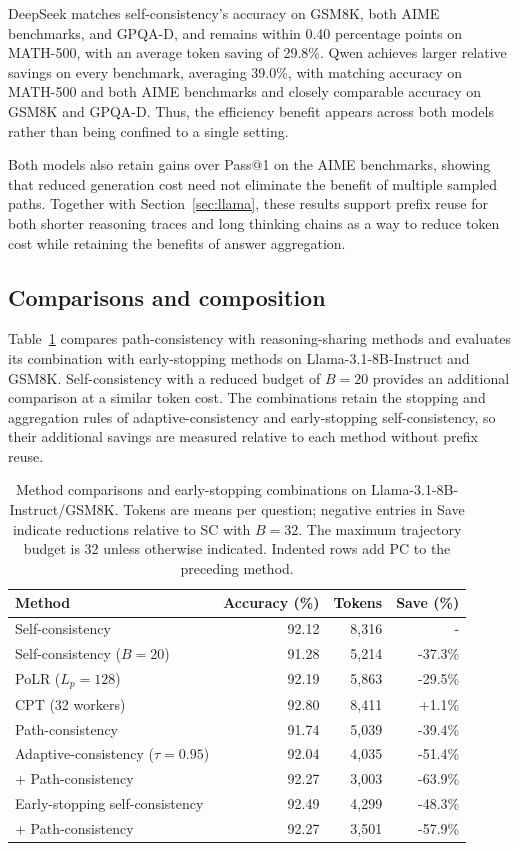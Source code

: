 DeepSeek matches self-consistency's accuracy on GSM8K, both AIME benchmarks, and GPQA-D, and remains within 0.40 percentage points on MATH-500, with an average token saving of 29.8\%. Qwen achieves larger relative savings on every benchmark, averaging 39.0\%, with matching accuracy on MATH-500 and both AIME benchmarks and closely comparable accuracy on GSM8K and GPQA-D. Thus, the efficiency benefit appears across both models rather than being confined to a single setting.

Both models also retain gains over Pass@1 on the AIME benchmarks, showing that reduced generation cost need not eliminate the benefit of multiple sampled paths. Together with Section~\ref{sec:llama}, these results support prefix reuse for both shorter reasoning traces and long thinking chains as a way to reduce token cost while retaining the benefits of answer aggregation.

\subsection{Comparisons and composition}
\label{sec:composition}
Table~\ref{tab:composition} compares path-consistency with reasoning-sharing methods and evaluates its combination with early-stopping methods on Llama-3.1-8B-Instruct and GSM8K. Self-consistency with a reduced budget of $B=20$ provides an additional comparison at a similar token cost. The combinations retain the stopping and aggregation rules of adaptive-consistency and early-stopping self-consistency, so their additional savings are measured relative to each method without prefix reuse.

\begin{table}[htbp]
\centering\small
\caption{Method comparisons and early-stopping combinations on Llama-3.1-8B-Instruct/GSM8K. Tokens are means per question; negative entries in Save indicate reductions relative to SC with $B=32$. The maximum trajectory budget is 32 unless otherwise indicated. Indented rows add PC to the preceding method.}
\label{tab:composition}
\begin{tabular}{lrrr}
\toprule
Method & Accuracy (\%) & Tokens & Save (\%)\\
\midrule
Self-consistency & 92.12 & 8,316 & - \\
Self-consistency ($B=20$) & 91.28 & 5,214 & -37.3\% \\
PoLR ($L_p=128$) & 92.19 & 5,863 & -29.5\% \\
CPT (32 workers) & 92.80 & 8,411 & +1.1\% \\
Path-consistency & 91.74 & 5,039 & -39.4\% \\
\midrule
Adaptive-consistency ($\tau=0.95$) & 92.04 & 4,035 & -51.4\% \\
 \quad + Path-consistency & 92.27 & 3,003 & -63.9\% \\
Early-stopping self-consistency & 92.49 & 4,299 & -48.3\% \\
 \quad + Path-consistency & 92.27 & 3,501 & -57.9\% \\
\bottomrule
\end{tabular}
\end{table}

